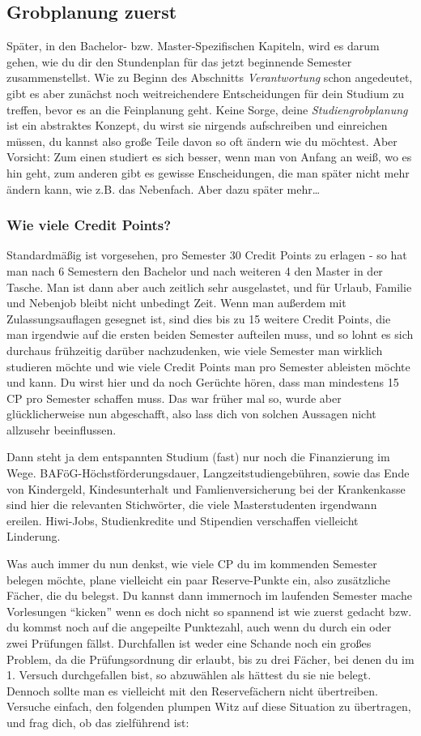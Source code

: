 \label{grob}\subsection{Grobplanung zuerst}
Später, in den Bachelor- bzw. Master-Spezifischen Kapiteln, wird es darum gehen, wie du dir den Stundenplan für das jetzt beginnende Semester zusammenstellst. Wie zu Beginn des Abschnitts \textit{Verantwortung} schon angedeutet, gibt es aber zunächst noch weitreichendere Entscheidungen für dein Studium zu treffen, bevor es an die Feinplanung geht. Keine Sorge, deine \textit{Studiengrobplanung} ist ein abstraktes Konzept, du wirst sie nirgends aufschreiben und einreichen müssen, du kannst also große Teile davon so oft ändern wie du möchtest. Aber Vorsicht: Zum einen studiert es sich besser, wenn man von Anfang an weiß, wo es hin geht, zum anderen gibt es gewisse Enscheidungen, die man später nicht mehr ändern kann, wie z.B. das Nebenfach. Aber dazu später mehr\ldots

\subsubsection{Wie viele Credit Points?}
Standardmäßig ist vorgesehen, pro Semester 30 Credit Points zu erlagen
- so hat man nach 6 Semestern den Bachelor und nach weiteren 4 den Master  in der Tasche. Man ist dann aber auch zeitlich sehr ausgelastet, und für Urlaub, Familie und Nebenjob bleibt nicht unbedingt Zeit. Wenn man außerdem mit Zulassungsauflagen gesegnet ist, sind dies bis zu 15 weitere Credit Points, die man irgendwie auf die ersten beiden Semester aufteilen muss, und so lohnt es sich durchaus frühzeitig darüber nachzudenken, wie viele Semester man wirklich studieren möchte und wie viele Credit Points man pro Semester ableisten möchte und kann. Du wirst hier und da noch Gerüchte hören, dass man mindestens 15 CP pro Semester schaffen muss. Das war früher mal so, wurde aber glücklicherweise nun abgeschafft, also lass dich von solchen Aussagen nicht allzusehr beeinflussen.

Dann steht ja dem entspannten Studium (fast) nur noch die Finanzierung im Wege. BAFöG-Höchstförderungsdauer, Langzeitstudiengebühren, sowie das Ende von Kindergeld, Kindesunterhalt und Famlienversicherung bei der Krankenkasse sind hier die relevanten Stichwörter, die viele Masterstudenten irgendwann ereilen. Hiwi-Jobs, Studienkredite und Stipendien verschaffen vielleicht Linderung.

Was auch immer du nun denkst, wie viele CP du im kommenden Semester
belegen möchte, plane vielleicht ein paar Reserve-Punkte ein, also
zusätzliche Fächer, die du belegst. Du kannst dann immernoch im
laufenden Semester mache Vorlesungen "`kicken"' wenn es doch nicht so
spannend ist wie zuerst gedacht bzw. du kommst noch auf die angepeilte
Punktezahl, auch wenn du durch ein oder zwei Prüfungen fällst.
Durchfallen ist weder eine Schande noch ein großes Problem, da die
Prüfungsordnung dir erlaubt, bis zu drei Fächer, bei denen du im 1.
Versuch durchgefallen bist, so abzuwählen als hättest du sie nie belegt. Dennoch sollte man es vielleicht mit den Reservefächern nicht übertreiben. Versuche einfach, den folgenden plumpen Witz auf diese Situation zu übertragen, und frag dich, ob das zielführend ist:

